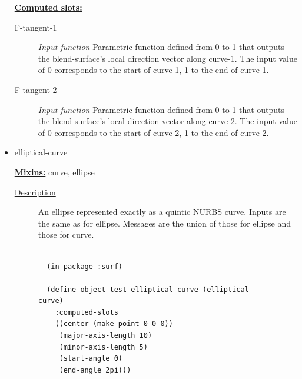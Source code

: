\documentclass [11pt]{book}
\begin{document}
\begin{itemize}
\textbf{
\underline{Computed slots:}}

\begin{description}

\item [F-tangent-1]
\emph{Input-function} Parametric function defined from 0 to 1 that outputs the blend-surface's local direction vector along curve-1. The input value of 0 corresponds to the start of curve-1, 1 to the end of curve-1.


\item [F-tangent-2]
\emph{Input-function} Parametric function defined from 0 to 1 that outputs the blend-surface's local direction vector along curve-2. The input value of 0 corresponds to the start of curve-2, 1 to the end of curve-2.


\end{description}







\item {}elliptical-curve


\textbf{
\underline{Mixins:}} curve, ellipse





\begin{description}

\item [
\underline{Description}]


An ellipse represented exactly as a quintic NURBS curve. Inputs are the same as for ellipse. 
Messages are the union of those for ellipse and those for curve.



\end{description}




\begin{figure}
\begin{lrbox}{\boxedverb}
\begin{minipage}{\linewidth}
{\small

\begin{verbatim}

  (in-package :surf)

  (define-object test-elliptical-curve (elliptical-curve)
    :computed-slots
    ((center (make-point 0 0 0)) 
     (major-axis-length 10) 
     (minor-axis-length 5) 
     (start-angle 0) 
     (end-angle 2pi)))
  

\end{verbatim}}
\end{minipage}
\end{lrbox}
\end{figure}
\end{itemize}
\end{document}
